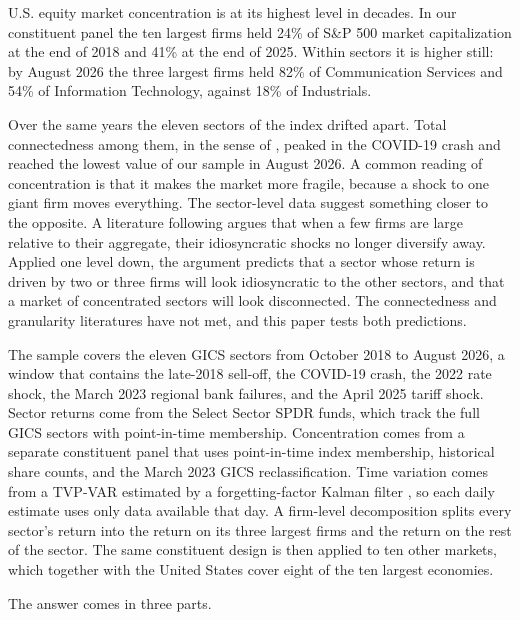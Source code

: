 \documentclass[11pt]{article}
\begin{document}
U.S. equity market concentration is at its highest level in decades. In our constituent panel the ten largest firms held 24\% of S\&P 500 market capitalization at the end of 2018 and 41\% at the end of 2025. Within sectors it is higher still: by August 2026 the three largest firms held 82\% of Communication Services and 54\% of Information Technology, against 18\% of Industrials.

Over the same years the eleven sectors of the index drifted apart. Total connectedness among them, in the sense of \citet{diebold2012}, peaked in the COVID-19 crash and reached the lowest value of our sample in August 2026. A common reading of concentration is that it makes the market more fragile, because a shock to one giant firm moves everything. The sector-level data suggest something closer to the opposite. A literature following \citet{gabaix2011} argues that when a few firms are large relative to their aggregate, their idiosyncratic shocks no longer diversify away. Applied one level down, the argument predicts that a sector whose return is driven by two or three firms will look idiosyncratic to the other sectors, and that a market of concentrated sectors will look disconnected. The connectedness and granularity literatures have not met, and this paper tests both predictions.

The sample covers the eleven GICS sectors from October 2018 to August 2026, a window that contains the late-2018 sell-off, the COVID-19 crash, the 2022 rate shock, the March 2023 regional bank failures, and the April 2025 tariff shock. Sector returns come from the Select Sector SPDR funds, which track the full GICS sectors with point-in-time membership. Concentration comes from a separate constituent panel that uses point-in-time index membership, historical share counts, and the March 2023 GICS reclassification. Time variation comes from a TVP-VAR estimated by a forgetting-factor Kalman filter \citep{koop2013, antonakakis2020}, so each daily estimate uses only data available that day. A firm-level decomposition splits every sector's return into the return on its three largest firms and the return on the rest of the sector. The same constituent design is then applied to ten other markets, which together with the United States cover eight of the ten largest economies.

The answer comes in three parts.
\end{document}
